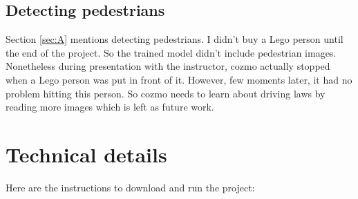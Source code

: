 \documentclass[12pt,a4paper]{article}
\begin{document}
\subsection{Detecting pedestrians}

Section \ref{sec:A} mentions detecting pedestrians. I didn't buy a Lego person until the end of the project. So the trained model didn't include pedestrian images. Nonetheless during presentation with the instructor, cozmo actually stopped when a Lego person was put in front of it. However, few moments later, it had no problem hitting this person. So cozmo needs to learn about driving laws by reading more images which is left as future work. 

\section{Technical details} \label{sec:technical}

Here are the instructions to download and run the project:
\end{document}
